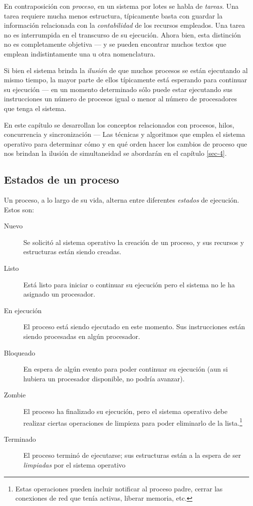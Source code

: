 \documentclass[11pt,fleqn]{book} %
\begin{document}
En contraposición con \emph{proceso}, en un sistema por lotes se habla de
\emph{tareas}. Una tarea requiere mucha menos estructura, típicamente
basta con guardar la información relacionada con la \emph{contabilidad} de
los recursos empleados. Una tarea no es interrumpida en el transcurso
de su ejecución. Ahora bien, esta distinción no es completamente
objetiva — y se pueden encontrar muchos textos que emplean
indistintamente una u otra nomenclatura.

Si bien el sistema brinda la \emph{ilusión} de que muchos procesos se
están ejecutando al mismo tiempo, la mayor parte de ellos típicamente
está esperando para continuar su ejecución — en un momento
determinado sólo puede estar ejecutando sus instrucciones un número
de procesos igual o menor al número de procesadores que tenga el sistema.

En este capítulo se desarrollan los conceptos relacionados con
procesos, hilos, concurrencia y sincronización — Las técnicas y
algoritmos que emplea el sistema operativo para determinar cómo y en
qué orden hacer los cambios de proceso que nos brindan la ilusión de
simultaneidad se abordarán en el capítulo \ref{sec-4}.
\subsection{Estados de un proceso}
\label{sec-3-1-1}
\label{PROC_estados_de_un_proceso}


Un proceso, a lo largo de su vida, alterna entre diferentes \emph{estados}
de ejecución. Estos son:

\begin{description}
\item[Nuevo] Se solicitó al sistema operativo la creación de un proceso,
           y sus recursos y estructuras están siendo creadas.
\item[Listo] Está listo para iniciar o continuar su ejecución pero el sistema
		no le ha asignado un procesador.
\item[En ejecución] El proceso está siendo ejecutado en este
                  momento. Sus instrucciones están siendo procesadas
                  en algún procesador.
\item[Bloqueado] En espera de algún evento para poder continuar
               su ejecución (aun si hubiera un procesador disponible,
               no podría avanzar).
\item[Zombie] El proceso ha finalizado su ejecución, pero el sistema
            operativo debe realizar ciertas operaciones de limpieza
            para poder eliminarlo de la lista.\footnote{Estas operaciones
            pueden incluir notificar al proceso padre, cerrar las
            conexiones de red que tenía activas, liberar memoria, etc. }
\item[Terminado] El proceso terminó de ejecutarse; sus estructuras están
               a la espera de ser \emph{limpiadas} por el sistema operativo
\end{description}
\end{document}
